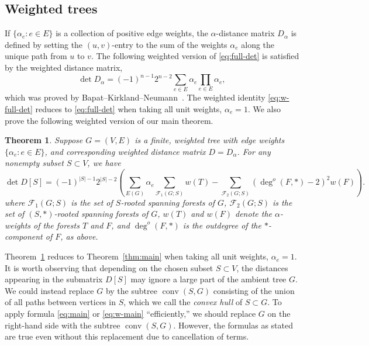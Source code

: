 \documentclass{amsart}
\newtheorem{thm}{Theorem}
\theoremstyle{definition}
\newcommand{\Da}{D_{\alpha}}
\DeclareMathOperator{\conv}{conv}
\newcommand{\trees}{\mathcal{F}_1}
\newcommand{\forests}{\mathcal{F}}
\newcommand{\degout}{\deg^o}
\begin{document}
\subsection{Weighted trees}
If $\{\alpha_e : e\in E\}$ is a collection of positive edge weights,  the $\alpha$-distance matrix $\Da$ 
is defined by setting the $(u,v)$-entry to the sum of the weights $\alpha_e$ along the unique path from $u$ to $v$.
The following weighted version of \eqref{eq:full-det}
is satisfied by the weighted distance matrix, 
\begin{equation}\label{eq:w-full-det}
	\det \Da = (-1)^{n-1} 2^{n-2} \sum_{e \in E} \alpha_e \prod_{e \in E} \alpha_e ,
\end{equation}
which was proved by Bapat--Kirkland--Neumann~\cite{bapat-kirkland-neumann}.
The weighted identity \eqref{eq:w-full-det} reduces to \eqref{eq:full-det} when taking all unit weights, $\alpha_e = 1$.
We also prove the following weighted version of our main theorem.
\begin{thm}
\label{thm:w-main}
Suppose $G = (V,E)$ is a finite, weighted tree with edge weights $\{\alpha_e : e \in E\}$, and corresponding weighted distance matrix $D = \Da$. For any nonempty subset $S \subset V$, we have
\begin{equation}\label{eq:w-main}
	\det D[S] = (-1)^{|S|-1} 2^{|S|-2} \left( \sum_{E(G)}\alpha_e \sum_{\trees(G;S)} w(T) - \sum_{\forests_2(G;S)} (\degout(F,*) - 2)^2 w(F) \right).
\end{equation}
where 
$\trees(G;S)$ is the set of $S$-rooted spanning forests of $G$,
$\forests_2(G;S)$ is the set of $(S,*)$-rooted spanning forests of $G$,
$w(T)$ and $w(F)$ denote the $\alpha$-weights of the forests $T$ and $F$,
and 
$\degout(F, *)$ is the outdegree of the $*$-component of $F$, as above.
\end{thm}
Theorem~\ref{thm:w-main} reduces to Theorem~\ref{thm:main} when taking all unit weights, $\alpha_e = 1$.
It is worth observing that depending on the chosen subset $S \subset V$, the distances appearing in the submatrix $D[S]$ may ignore a large part of the ambient tree $G$.
We could instead replace $G$ by the subtree  $\conv(S,G)$ consisting of the union of all paths between vertices in $S$,
which we call the {\em convex hull} of $S \subset G$.
To apply formula \eqref{eq:main} or \eqref{eq:w-main} ``efficiently,''
we should replace $G$ on the right-hand side with the subtree $\conv(S,G)$.
However, the formulas as stated are true even without this replacement due to cancellation of terms.
\end{document}
